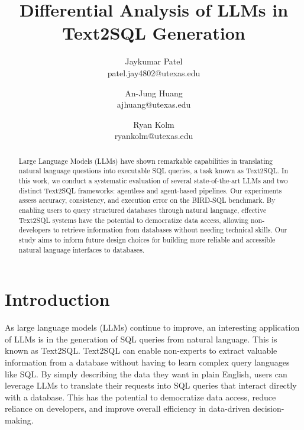 \documentclass[10pt,twocolumn]{article}
\title{Differential Analysis of LLMs in Text2SQL Generation}
\author{Jaykumar Patel\\
patel.jay4802@utexas.edu\\
\and
An-Jung Huang\\
ajhuang@utexas.edu\\
\and
Ryan Kolm\\
ryankolm@utexas.edu\\
}
\begin{document}
\maketitle

\begin{abstract}

Large Language Models (LLMs) have shown remarkable capabilities in translating natural language questions into executable SQL queries, a task known as Text2SQL. In this work, we conduct a systematic evaluation of several state-of-the-art LLMs and two distinct Text2SQL frameworks: agentless and agent-based pipelines. Our experiments assess accuracy, consistency, and execution error on the BIRD-SQL benchmark. By enabling users to query structured databases through natural language, effective Text2SQL systems have the potential to democratize data access, allowing non-developers to retrieve information from databases without needing technical skills. Our study aims to inform future design choices for building more reliable and accessible natural language interfaces to databases.
        

\end{abstract}

\section{Introduction}

As large language models (LLMs) continue to improve, an interesting application of LLMs is in the generation of SQL queries from natural language. This is known as Text2SQL. Text2SQL can enable non-experts to extract valuable information from a database without having to learn complex query languages like SQL. By simply describing the data they want in plain English, users can leverage LLMs to translate their requests into SQL queries that interact directly with a database. This has the potential to democratize data access, reduce reliance on developers, and improve overall efficiency in data-driven decision-making.
\end{document}
